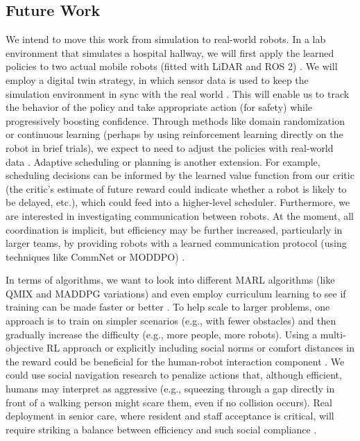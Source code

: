 \documentclass[conference]{IEEEtran}
\begin{document}
\subsection{Future Work}
We intend to move this work from simulation to real-world robots. In a lab environment that simulates a hospital hallway, we will first apply the learned policies to two actual mobile robots (fitted with LiDAR and ROS 2) \citep{ztouni2021}. We will employ a digital twin strategy, in which sensor data is used to keep the simulation environment in sync with the real world \citep{yoo2023, yoo2023a}. This will enable us to track the behavior of the policy and take appropriate action (for safety) while progressively boosting confidence. Through methods like domain randomization or continuous learning (perhaps by using reinforcement learning directly on the robot in brief trials), we expect to need to adjust the policies with real-world data \citep{yang2022}. Adaptive scheduling or planning is another extension. For example, scheduling decisions can be informed by the learned value function from our critic (the critic’s estimate of future reward could indicate whether a robot is likely to be delayed, etc.), which could feed into a higher-level scheduler. Furthermore, we are interested in investigating communication between robots. At the moment, all coordination is implicit, but efficiency may be further increased, particularly in larger teams, by providing robots with a learned communication protocol (using techniques like CommNet or MODDPO) \citep{ivanovic2019, yang2022}.

In terms of algorithms, we want to look into different MARL algorithms (like QMIX and MADDPG variations) and even employ curriculum learning to see if training can be made faster or better \citep{wang2023a, yang2022}. To help scale to larger problems, one approach is to train on simpler scenarios (e.g., with fewer obstacles) and then gradually increase the difficulty (e.g., more people, more robots). Using a multi-objective RL approach or explicitly including social norms or comfort distances in the reward could be beneficial for the human-robot interaction component \citep{yang2022, rostumi2019}. We could use social navigation research to penalize actions that, although efficient, humans may interpret as aggressive (e.g., squeezing through a gap directly in front of a walking person might scare them, even if no collision occurs). Real deployment in senior care, where resident and staff acceptance is critical, will require striking a balance between efficiency and such social compliance \citep{ivanovic2019, rostumi2019}.
\end{document}
